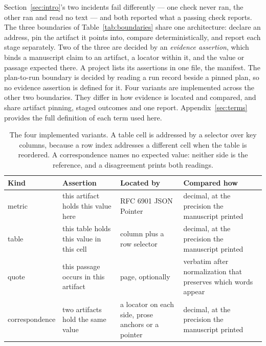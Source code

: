 \documentclass{article}
\begin{document}
Section~\ref{sec:intro}'s two incidents fail differently --- one check never ran, the other ran
and read no text --- and both reported what a passing check reports. The three boundaries of
Table~\ref{tab:boundaries} share one architecture: declare an address, pin the
artifact it points into, compare deterministically, and report each stage separately. Two of the three are decided by an \emph{evidence assertion}, which
binds a manuscript claim to an artifact, a locator within it, and the value or passage expected
there. A project lists its assertions in one file, the manifest. The plan-to-run boundary is decided by reading a run record beside a pinned plan, so no
evidence assertion is defined for it. Four variants are implemented across the other two
boundaries. They differ in how evidence is located and compared, and share artifact pinning,
staged outcomes and one report. Appendix~\ref{sec:terms} provides the full definition of each term used here.

\begin{table}[h]
\centering
\small
\caption{The four implemented variants. A table cell is addressed by a selector over key columns,
because a row index addresses a different cell when the table is reordered. A correspondence names
no expected value: neither side is the reference, and a disagreement prints both readings.}
\label{tab:contract}
\begin{tabular}{@{}>{\raggedright\arraybackslash}p{}>{\raggedright\arraybackslash}p{}>{\raggedright\arraybackslash}p{}>{\raggedright\arraybackslash}p{}@{}}
\toprule
\textbf{Kind} & \textbf{Assertion} & \textbf{Located by} & \textbf{Compared how} \\
\midrule
metric & this artifact holds this value here & RFC 6901 JSON Pointer & decimal, at the precision the manuscript printed \\
table & this table holds this value in this cell & column plus a row selector & decimal, at the precision the manuscript printed \\
quote & this passage occurs in this artifact & page, optionally & verbatim after normalization that preserves which words appear \\
correspondence & two artifacts hold the same value & a locator on each side, prose anchors or a pointer & decimal, at the precision the manuscript printed \\
\bottomrule
\end{tabular}
\end{table}
\end{document}

